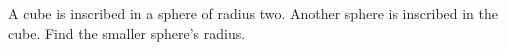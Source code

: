 A cube is inscribed in a sphere of radius two. Another sphere is inscribed in the cube. Find the smaller sphere's radius.
